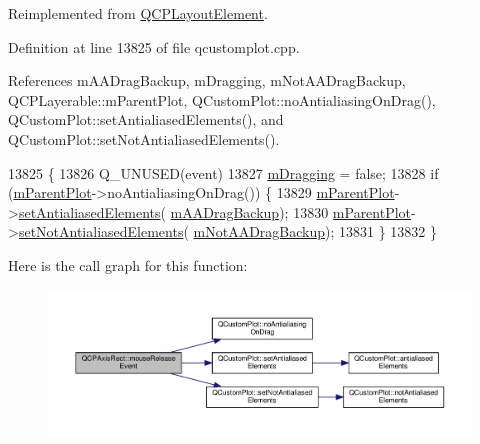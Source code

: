 Reimplemented from \hyperlink{class_q_c_p_layout_element_ae526ac828cce1e5bb94eaa85776d7404}{Q\+C\+P\+Layout\+Element}.



Definition at line 13825 of file qcustomplot.\+cpp.



References m\+A\+A\+Drag\+Backup, m\+Dragging, m\+Not\+A\+A\+Drag\+Backup, Q\+C\+P\+Layerable\+::m\+Parent\+Plot, Q\+Custom\+Plot\+::no\+Antialiasing\+On\+Drag(), Q\+Custom\+Plot\+::set\+Antialiased\+Elements(), and Q\+Custom\+Plot\+::set\+Not\+Antialiased\+Elements().


\begin{DoxyCode}
13825                                                       \{
13826   Q\_UNUSED(event)
13827   \hyperlink{class_q_c_p_axis_rect_ab49a6698194cf0e9e38a1d734c0888a8}{mDragging} = false;
13828   if (\hyperlink{class_q_c_p_layerable_aa2a528433e44db02b8aef23c1f9f90ed}{mParentPlot}->noAntialiasingOnDrag()) \{
13829     \hyperlink{class_q_c_p_layerable_aa2a528433e44db02b8aef23c1f9f90ed}{mParentPlot}->\hyperlink{class_q_custom_plot_af6f91e5eab1be85f67c556e98c3745e8}{setAntialiasedElements}(
      \hyperlink{class_q_c_p_axis_rect_aa4a24f76360cfebe1bcf17a77fa7521b}{mAADragBackup});
13830     \hyperlink{class_q_c_p_layerable_aa2a528433e44db02b8aef23c1f9f90ed}{mParentPlot}->\hyperlink{class_q_custom_plot_ae10d685b5eabea2999fb8775ca173c24}{setNotAntialiasedElements}(
      \hyperlink{class_q_c_p_axis_rect_a6fcb12e052e276d57efbb128be31d6f5}{mNotAADragBackup});
13831   \}
13832 \}
\end{DoxyCode}


Here is the call graph for this function\+:\nopagebreak
\begin{figure}[H]
\begin{center}
\leavevmode
\includegraphics[width=350pt]{class_q_c_p_axis_rect_adf6c99780cea55ab39459a6eaad3a94a_cgraph}
\end{center}
\end{figure}


\hypertarget{class_q_c_p_axis_rect_a5b0d629c8de5572945eeae79a142296e}{}
